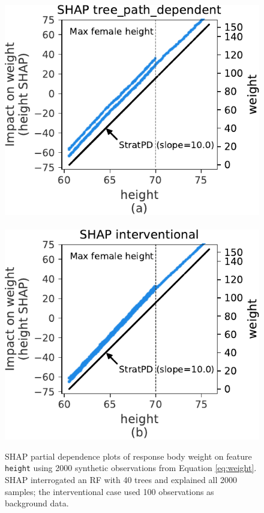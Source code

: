 \documentclass[11pt]{article}
\newcommand{\todo}[1]{{{\small\color{red}{[#1]}}}}
\begin{document}
\begin{figure}[htbp]
\begin{center}
\includegraphics[scale=0.5]{images/weight-shap-tree_path_dependent.pdf}~~
\includegraphics[scale=0.5]{images/weight-shap-interventional.pdf}
\caption{\small SHAP partial dependence plots of response body weight on feature {\tt height} using 2000 synthetic observations from Equation \eqref{eq:weight}. SHAP interrogated an RF with 40 trees and explained all 2000 samples; the interventional case used 100 observations as background data. \todo{just ref paper \#1}}
\label{fig:shap-weight}
\end{center}
\end{figure}
\end{document}
